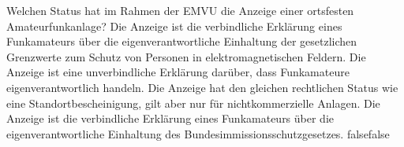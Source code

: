     {Welchen Status hat im Rahmen der EMVU die Anzeige einer ortsfesten Amateurfunkanlage?}
    {Die Anzeige ist die verbindliche Erklärung eines Funkamateurs über die eigenverantwortliche Einhaltung der gesetzlichen Grenzwerte zum Schutz von Personen in elektromagnetischen Feldern.}
    {Die Anzeige ist eine unverbindliche Erklärung darüber, dass Funkamateure eigenverantwortlich handeln.}
    {Die Anzeige hat den gleichen rechtlichen Status wie eine Standortbescheinigung, gilt aber nur für nichtkommerzielle Anlagen.}
    {Die Anzeige ist die verbindliche Erklärung eines Funkamateurs über die eigenverantwortliche Einhaltung des Bundesimmissionsschutzgesetzes.}
    {false}{false}
